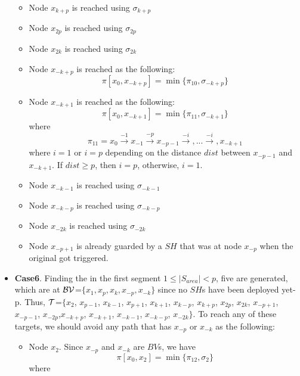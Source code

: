 \begin{itemize}
\begin{itemize}
\item Node $x_{k+p}$ is reached using $\sigma_{k+p}$ 

\item Node $x_{2p}$ is reached using $\sigma_{2p}$ 

\item Node $x_{2k}$ is reached using $\sigma_{2k}$ 

\item Node $x_{-k+p}$ is reached as the following:  
$$ \pi[x_0,x_{-k+p}] = \min \{ \pi_{10},\sigma_{-k+p}\}$$

\item Node $x_{-k+1}$ is reached as the following:
$$ \pi[x_0,x_{-k+1}] = \min \{ \pi_{11},\sigma_{-k+1}\}$$
where 
$$ \pi_{11} = x_{0} \xrightarrow {-1} x_{-1} \xrightarrow {-p} x_{-p-1} \xrightarrow {-i},...\xrightarrow {-i},x_{-k+1}  $$
where $i=1$ or $i=p$ depending on the distance $dist$ between $x_{-p-1}$ and $x_{-k+1}$. If $dist \ge p$, then $i=p$, otherwise, $i=1$.\\


\item Node $x_{-k-1}$ is reached using $\sigma_{-k-1}$ 

\item Node $x_{-k-p}$ is reached using $\sigma_{-k-p}$ 

\item Node $x_{-2k}$ is reached using $\sigma_{-2k}$ 

\item Node $x_{-p+1}$ is already guarded by a $SH$ that was at node $x_{-p}$ when the original \bv got triggered.


\end{itemize}


\item {\bf Case6}. Finding the \bv in the first segment $1\leq |S_{area}| <p$, five \bvs are generated, which are at $\cal BV$=$\{x_1,x_p,x_k,x_{-p},x_{-k}\}$ since no $SH$s have been deployed yet-p. Thus,
$\cal T$=$\{x_{2}$, $x_{p-1}$,  $x_{k-1}$, $x_{p+1}$, $x_{k+1}$, $x_{k-p}$, $x_{k+p}$, $x_{2p}$, $x_{2k}$, $x_{-p+1}$, $x_{-p-1}$, $x_{-2p}$,$x_{-k+p}$, $x_{-k+1}$, $x_{-k-1}$, $x_{-k-p}$, $x_{-2k}\}$. To reach any of these targets, we should avoid any path that has $x_{-p}$ or $x_{-k}$ as the following:
\begin{itemize}
\item Node $x_{2}$. Since $x_{-p}$ and $x_{-k}$ are $BV$s, we have
$$ \pi[x_0,x_{2}] = \min \{ \pi_{12},\sigma_{2}\}$$
where


\end{itemize}
\end{itemize}
